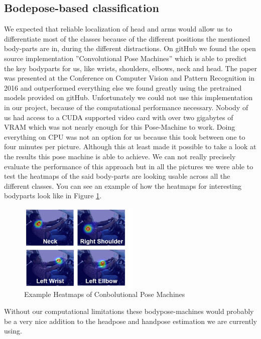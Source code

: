 \documentclass[10pt,twocolumn,letterpaper]{article}
\begin{document}
\subsection{Bodepose-based classification}
We expected that reliable localization of head and arms would allow us to differentiate most of the classes because of the different positions the mentioned body-parts are in, during the different distractions. On gitHub we found the open source implementation ''Convolutional Pose Machines'' which is able to predict the key bodyparts for us, like wrists, shoulders, elbows, neck and head.\cite{DBLP:journals/corr/WeiRKS16} The paper was presented at the Conference on Computer Vision and Pattern Recognition in 2016 and outperformed everything else we found greatly using the pretrained models provided on gitHub. Unfortunately we could not use this implementation in our project, because of the computational performance necessary. Nobody of us had access to a CUDA supported video card with over two gigabytes of VRAM which was not nearly enough for this Pose-Machine to work. Doing everything on CPU was not an option for us because this took between one to four minutes per picture. Although this at least made it possible to take a look at the results this pose machine is able to achieve. We can not really precisely evaluate the performance of this approach but in all the pictures we were able to test the heatmaps of the said body-parts are looking usable across all the different classes. You can see an example of how the heatmaps for interesting bodyparts look like in Figure \ref{BodyPoseExample}.\\
\begin{figure}[h]
    \centering
    \includegraphics[width=0.5\textwidth]{BodyPoseExample}
    \caption{Example Heatmaps of Conbolutional Pose Machines}
    \label{BodyPoseExample}
\end{figure}

Without our computational limitations these bodypose-machines would probably be a very nice addition to the headpose and handpose estimation we are currently using.
\end{document}

